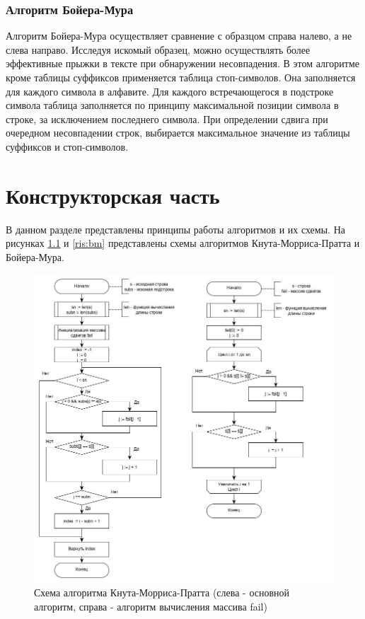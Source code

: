 \documentclass[12pt, a4paper]{report}
\begin{document}
	\subsection{Алгоритм Бойера-Мура}
	Алгоритм Бойера-Мура осуществляет сравнение с образцом справа налево, а не слева направо. Исследуя искомый образец, можно осуществлять более эффективные прыжки в тексте при обнаружении несовпадения. В этом алгоритме кроме таблицы суффиксов применяется таблица стоп-символов. Она заполняется для каждого символа в алфавите. Для каждого встречающегося в подстроке символа таблица заполняется по принципу максимальной позиции символа в строке, за исключением последнего символа. При определении сдвига при очередном несовпадении строк, выбирается максимальное значение из таблицы суффиксов и стоп-символов\cite{macconnell}.
	
	\chapter{Конструкторская часть}
	
	В данном разделе представлены принципы работы алгоритмов и их схемы.
	На рисунках \ref{ris:kmp} и \ref{ris:bm} представлены схемы алгоритмов Кнута-Морриса-Пратта и Бойера-Мура.
	\begin{figure}[ht!]
		\centering
		\includegraphics[scale=0.55]{img/kmp_ext.jpg}
		\caption{Схема алгоритма Кнута-Морриса-Пратта (слева - основной алгоритм, справа - алгоритм вычисления массива fail)}
		\label{ris:kmp}
	\end{figure}\newpage
	
\end{document}
